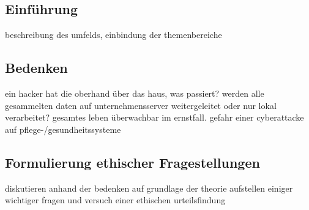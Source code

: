 \documentclass[letterpaper, 12pt]{article}
\let\tempsubsection\subsection
\renewcommand\subsection[1]{\vspace{0cm}\tempsubsection{#1}\vspace{0cm}}
\begin{document}
\subsection{Einführung}
beschreibung des umfelds, einbindung der themenbereiche

\subsection{Bedenken}

ein hacker hat die oberhand über das haus, was passiert? werden alle gesammelten daten auf unternehmensserver weitergeleitet oder nur lokal verarbeitet? gesamtes leben überwachbar im ernstfall. gefahr einer cyberattacke auf pflege-/gesundheitssysteme

\subsection{Formulierung ethischer Fragestellungen}

diskutieren anhand der bedenken auf grundlage der theorie \newline
aufstellen einiger wichtiger fragen und versuch einer ethischen urteilsfindung

\clearpage



\lstlistoflistings
\listoffigures
\end{document}
